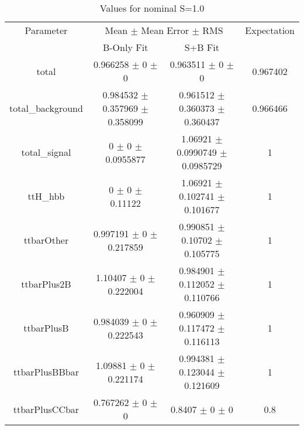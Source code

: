 \begin{table}
\centering
\caption{Values for nominal S=1.0}
\begin{tabular}{cccc}
\toprule
Parameter & \multicolumn{2}{c}{Mean $\pm$ Mean Error $\pm$ RMS} & Expectation\\
 & B-Only Fit & S+B Fit & \\
\midrule
total & \num{0.966258} $\pm$ \num{0} $\pm$ \num{0} & \num{0.963511} $\pm$ \num{0} $\pm$ \num{0} & \num{0.967402}\\
total\_background & \num{0.984532} $\pm$ \num{0.357969} $\pm$ \num{0.358099} & \num{0.961512} $\pm$ \num{0.360373} $\pm$ \num{0.360437} & \num{0.966466}\\
total\_signal & \num{0} $\pm$ \num{0} $\pm$ \num{0.0955877} & \num{1.06921} $\pm$ \num{0.0990749} $\pm$ \num{0.0985729} & \num{1}\\
ttH\_hbb & \num{0} $\pm$ \num{0} $\pm$ \num{0.11122} & \num{1.06921} $\pm$ \num{0.102741} $\pm$ \num{0.101677} & \num{1}\\
ttbarOther & \num{0.997191} $\pm$ \num{0} $\pm$ \num{0.217859} & \num{0.990851} $\pm$ \num{0.10702} $\pm$ \num{0.105775} & \num{1}\\
ttbarPlus2B & \num{1.10407} $\pm$ \num{0} $\pm$ \num{0.222004} & \num{0.984901} $\pm$ \num{0.112052} $\pm$ \num{0.110766} & \num{1}\\
ttbarPlusB & \num{0.984039} $\pm$ \num{0} $\pm$ \num{0.222543} & \num{0.960909} $\pm$ \num{0.117472} $\pm$ \num{0.116113} & \num{1}\\
ttbarPlusBBbar & \num{1.09881} $\pm$ \num{0} $\pm$ \num{0.221174} & \num{0.994381} $\pm$ \num{0.123044} $\pm$ \num{0.121609} & \num{1}\\
ttbarPlusCCbar & \num{0.767262} $\pm$ \num{0} $\pm$ \num{0} & \num{0.8407} $\pm$ \num{0} $\pm$ \num{0} & \num{0.8}\\
\bottomrule
\end{tabular}
\end{table}